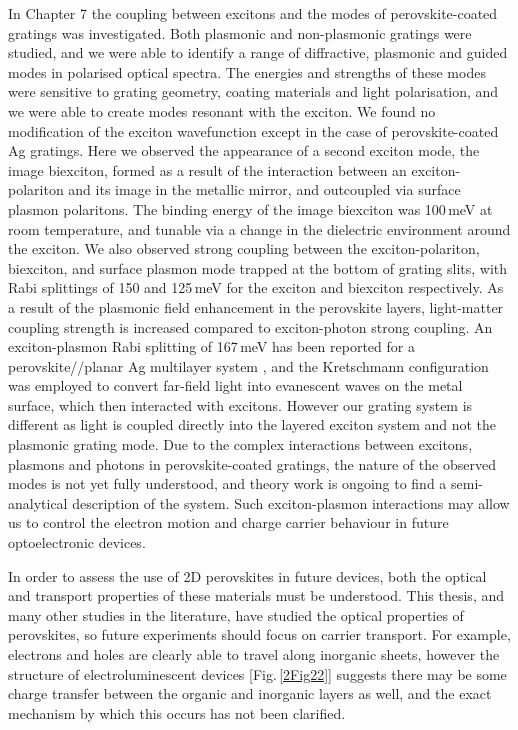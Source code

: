 In Chapter 7 the coupling between excitons and the modes of perovskite-coated gratings was investigated. Both plasmonic and non-plasmonic gratings were studied, and we were able to identify a range of diffractive, plasmonic and guided modes in polarised optical spectra. The energies and strengths of these modes were sensitive to grating geometry, coating materials and light polarisation, and we were able to create modes resonant with the exciton. We found no modification of the exciton wavefunction except in the case of perovskite-coated Ag gratings. Here we observed the appearance of a second exciton mode, the image biexciton, formed as a result of the interaction between an exciton-polariton and its image in the metallic mirror, and outcoupled via surface plasmon polaritons. The binding energy of the image biexciton was 100\,meV at room temperature, and tunable via a change in the dielectric environment around the exciton. We also observed strong coupling between the exciton-polariton, biexciton, and surface plasmon mode trapped at the bottom of grating slits, with Rabi splittings of 150 and 125\,meV for the exciton and biexciton respectively. %
As a result of the plasmonic field enhancement in the perovskite layers, light-matter coupling strength is increased compared to exciton-photon strong coupling. An exciton-plasmon Rabi splitting of 167\,meV has been reported for a perovskite//planar Ag multilayer system \cite{Symonds2007}, and the Kretschmann configuration was employed to convert far-field light into evanescent waves on the metal surface, which then interacted with excitons. However our grating system is different as light is coupled directly into the layered exciton system and not the plasmonic grating mode. Due to the complex interactions between excitons, plasmons and photons in perovskite-coated gratings, the nature of the observed modes is not yet fully understood, and theory work is ongoing to find a semi-analytical description of the system. Such exciton-plasmon interactions may allow us to control the electron motion and charge carrier behaviour in future optoelectronic devices. %

In order to assess the use of 2D perovskites in future devices, both the optical and transport properties of these materials must be understood. This thesis, and many other studies in the literature, have studied the optical properties of perovskites, so future experiments should focus on carrier transport. For example, electrons and holes are clearly able to travel along inorganic sheets, however the structure of electroluminescent devices [Fig.\,\ref{2Fig22}] suggests there may be some charge transfer between the organic and inorganic layers as well, and the exact mechanism by which this occurs has not been clarified. 

